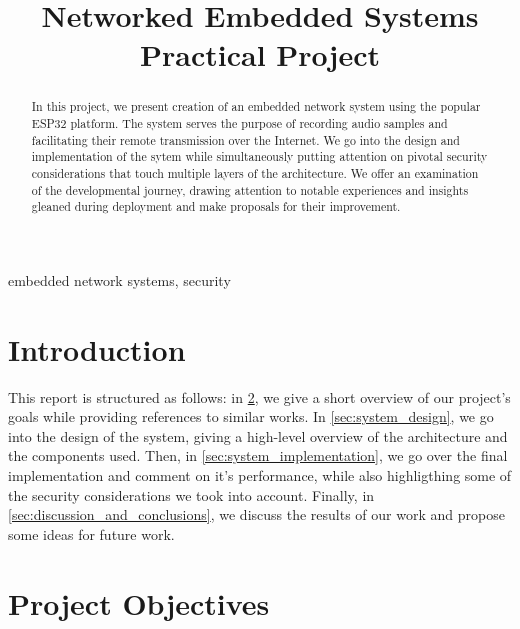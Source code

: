 \documentclass[conference]{IEEEtran}
\begin{document}
\title{Networked Embedded Systems Practical Project}

\author{
\and
{}
}

\maketitle

\begin{abstract}
    In this project, we present creation of an
    embedded network system using the popular ESP32 platform. The system serves
    the purpose of recording audio samples and facilitating their remote
    transmission over the Internet. We go into the design and implementation
    of the sytem while simultaneously putting attention
    on pivotal security considerations that touch multiple
    layers of the architecture. We offer an examination of
    the developmental journey, drawing attention to notable experiences and
    insights gleaned during deployment and make proposals for their improvement.
\end{abstract}

\begin{IEEEkeywords}
embedded network systems, security
\end{IEEEkeywords}

\section{Introduction}

This report is structured as follows: in \cref{sec:background}, 
we give a short overview of our project's goals while providing references to similar works. 
In \cref{sec:system_design}, we go into the design of the system, giving a high-level overview of the architecture and 
the components used. Then, in \cref{sec:system_implementation}, we go over the final implementation and comment on it's performance, 
while also highligthing some of the security considerations we took into account. Finally, in \cref{sec:discussion_and_conclusions},
we discuss the results of our work and propose some ideas for future work.

\section{Project Objectives} %
\label{sec:background}
\end{document}
